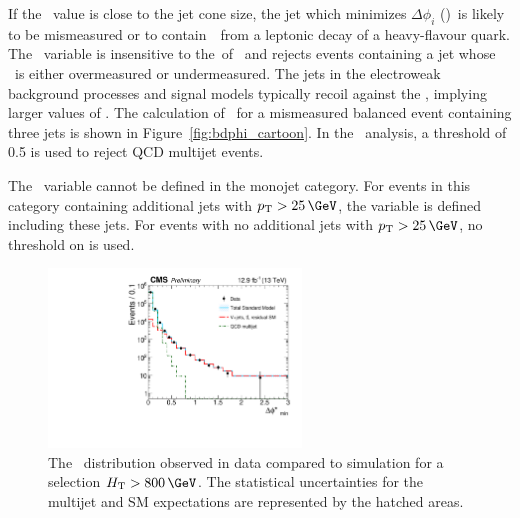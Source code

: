 If the \bdphi~value is close to the jet cone size, the jet which minimizes $\Delta \phi_i$ (\jbdphi)~is likely 
to be mismeasured or to contain~\met~from a leptonic decay of a heavy-flavour quark. The \bdphi~variable is insensitive to
the~\pt of \jbdphi~and rejects events containing a jet whose \pt~is either overmeasured or undermeasured.
The jets in the electroweak background processes and signal models typically recoil against the
\met, implying larger values of \bdphi. The calculation of \bdphi~for a mismeasured balanced 
event containing three jets is shown in Figure~\ref{fig:bdphi_cartoon}. 
In the \alphat~analysis, a threshold of 0.5 is used to reject QCD multijet events.

The \bdphi~variable cannot be defined in the monojet category. For events in this category
containing additional jets with $\pt > 25\,\GeV$, the \bdphi variable is defined 
including these jets. For events with no additional jets with $\pt > 25\,\GeV$,
no threshold on \bdphi is used.


\begin{figure}[!htb]
  \centering
    \includegraphics[width=0.6\textwidth]{./Figures/alphat/bdphi_data.pdf}
  \caption{
    The \bdphi~distribution observed in data compared to simulation for a selection $\scalht > 800\,\GeV$.
    The statistical uncertainties for the multijet and SM expectations are represented by the hatched areas. 
    }
  \label{fig:bdphi-data}
\end{figure}


